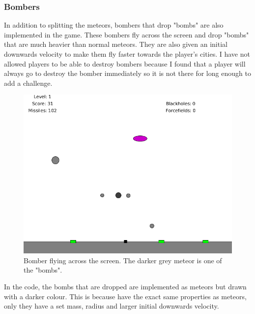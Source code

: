 \documentclass{article}
\begin{document}
\subsubsection*{Bombers}
In addition to splitting the meteors, bombers that drop "bombs" are also implemented in the game. These bombers fly across the screen and drop "bombs" that are much heavier than normal meteors. They are also given an initial downwards velocity to make them fly faster towards the player's cities. I have not allowed players to be able to destroy bombers because I found that a player will always go to destroy the bomber immediately so it is not there for long enough to add a challenge.
\begin{figure}[H]
\centering
\includegraphics[width=1\textwidth, keepaspectratio]{imgs/Bomber.png}
\caption{Bomber flying across the screen. The darker grey meteor is one of the "bombs".}
\end{figure}
\noindent
In the code, the bombs that are dropped are implemented as meteors but drawn with a darker colour. This is because have the exact same properties as meteors, only they have a set mass, radius and larger initial downwards velocity.  
\end{document}
